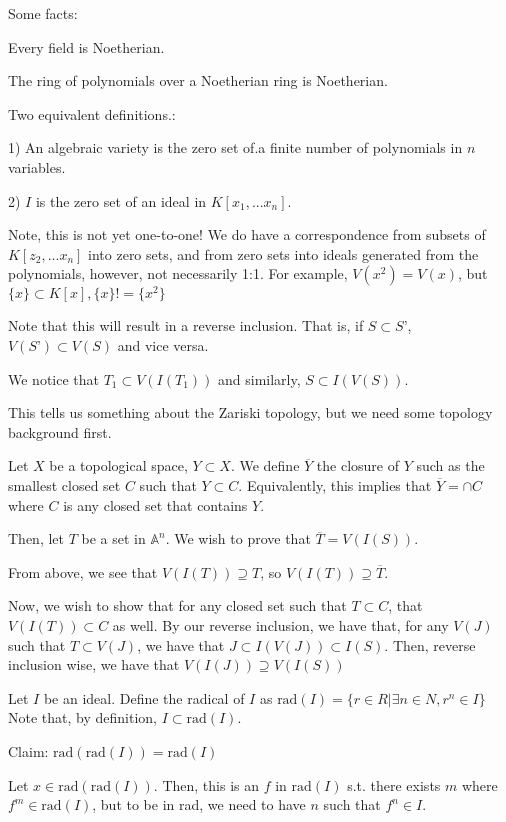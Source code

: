 \documentclass[10pt]{article}
\begin{document}
Some facts:

Every field is Noetherian.

The ring of polynomials over a Noetherian ring is Noetherian.

Two equivalent definitions.:

1) An algebraic variety is the zero set of.a finite number of polynomials in $n$ variables.

2) $I$ is the zero set of an ideal in $K[x_1,...x_n]$.

Note, this is not yet one-to-one! We do have a correspondence from subsets of $K[z_2,...x_n]$ into zero sets, and from zero sets into ideals generated from the polynomials, however, not necessarily 1:1. For example, $V(x^2) = V(x)$, but $\{x\} \subset K[x], \{x\} != \{x^2\}$

Note that this will result in a reverse inclusion. That is, if $S \subset S’$, $V(S’) \subset V(S)$ and vice versa.

We notice that $T_1 \subset V(I(T_1))$  and similarly, $S \subset I(V(S))$.

This tells us something about the Zariski topology, but we need some topology background first.

Let $X$ be a topological space, $Y \subset X$. We define $\overline{Y}$ the closure of $Y$ such as the smallest closed set $C$ such that $Y \subset C$. Equivalently, this implies that $\overline{Y} = \cap C$ where $C$ is any closed set that contains $Y$.

Then, let $T$ be a set in $\mathbb{A}^n$. We wish to prove that $\overline{T} = V(I(S))$.

From above, we see that $V(I(T)) \supseteq T$, so $V(I(T)) \supseteq \overline{T}$.

Now, we wish to show that for any closed set such that $T \subset C$, that $V(I(T)) \subset C$ as well. By our reverse inclusion, we have that, for any $V(J)$ such that $T \subset V(J)$, we have that $J \subset I(V(J)) \subset I(S)$. Then, reverse inclusion wise, we have that 
$V(I(J)) \supseteq V(I(S))$

Let $I$ be an ideal. Define the radical of $I$ as  $\text{rad}(I) = \{ r \in R | \exists n \in N, r^n \in I \}$ Note that, by definition, $I \subset \text{rad}(I)$.

Claim: $\text{rad}(\text{rad}(I)) = \text{rad}(I)$

Let $x \in \text{rad}(\text{rad}(I)) $. Then, this is an $f$ in $\text{rad}(I)$ s.t. there exists $m$ where $f^m \in \text{rad}(I)$, but to be in rad, we need to have $n$ such that $f^n \in I$. 
\end{document}
